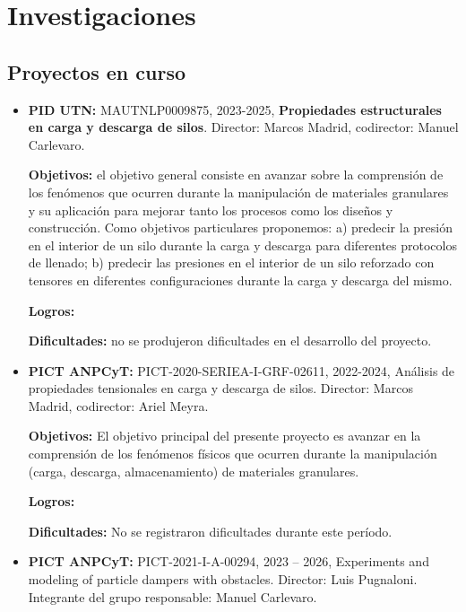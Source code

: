 \documentclass[a4paper,11pt,twoside,final,titlepage,onecolumn,openright]{report}
\begin{document}
\section{Investigaciones}

\subsection{Proyectos en curso}

\begin{itemize}
  
\item {\bf PID UTN:} MAUTNLP0009875, 2023-2025, {\bf Propiedades estructurales en carga y descarga de silos}. Director: Marcos Madrid, codirector: Manuel Carlevaro.
 
{\bf Objetivos:} el objetivo general consiste en avanzar sobre la comprensión de los fenómenos que ocurren durante la manipulación de materiales granulares y su aplicación para mejorar tanto los procesos como los diseños y construcción. Como objetivos particulares proponemos: a) predecir la presión en el interior de un silo durante la carga y descarga para diferentes protocolos de llenado; b) predecir las presiones en el interior de un silo reforzado con tensores en diferentes configuraciones durante la carga y descarga del mismo.

{\bf Logros:}  
 
 {\bf Dificultades:} no se produjeron dificultades en el desarrollo del proyecto. 


\item \textbf{PICT ANPCyT:} PICT-2020-SERIEA-I-GRF-02611, 2022-2024, Análisis de propiedades tensionales en carga y descarga de silos. Director: Marcos Madrid, codirector: Ariel Meyra.

    \textbf{Objetivos:} El objetivo principal del presente proyecto es avanzar en la comprensión de los fenómenos físicos que ocurren durante la manipulación (carga, descarga, almacenamiento) de materiales granulares. 

    \textbf{Logros:}  


    \textbf{Dificultades:} No se registraron dificultades durante este período.


\item \textbf{PICT ANPCyT:} PICT-2021-I-A-00294, 2023 -- 2026, Experiments and modeling of particle dampers with obstacles. Director: Luis Pugnaloni. Integrante del grupo responsable: Manuel Carlevaro.


\end{itemize}
\end{document}
